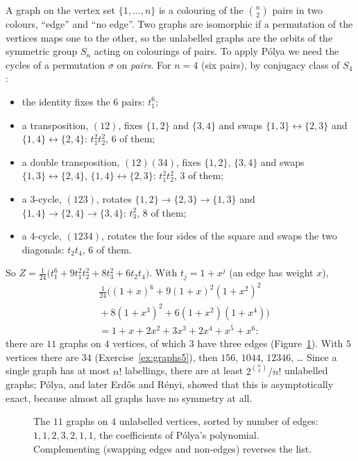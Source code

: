 A graph on the vertex set $\{1,\dots,n\}$ is a colouring of the $\binom n2$ pairs in two colours, ``edge'' and ``no edge''. Two graphs are
isomorphic if a permutation of the vertices maps one to the other, so the unlabelled graphs are the orbits of the symmetric
group $S_n$ acting on colourings of pairs. To apply P\'olya we need the cycles of a permutation $\sigma$ on \emph{pairs}. For $n=4$ (six
pairs), by conjugacy class of $S_4$:
\begin{itemize}
\item the identity fixes the $6$ pairs: $t_1^6$;
\item a transposition, $(12)$, fixes $\{1,2\}$ and $\{3,4\}$ and swaps $\{1,3\}\leftrightarrow\{2,3\}$ and $\{1,4\}\leftrightarrow\{2,4\}$: $t_1^2t_2^2$, $6$ of them;
\item a double transposition, $(12)(34)$, fixes $\{1,2\}$, $\{3,4\}$ and swaps $\{1,3\}\leftrightarrow\{2,4\}$, $\{1,4\}\leftrightarrow\{2,3\}$: $t_1^2t_2^2$, $3$ of them;
\item a $3$-cycle, $(123)$, rotates $\{1,2\}\to\{2,3\}\to\{1,3\}$ and $\{1,4\}\to\{2,4\}\to\{3,4\}$: $t_3^2$, $8$ of them;
\item a $4$-cycle, $(1234)$, rotates the four sides of the square and swaps the two diagonals: $t_2t_4$, $6$ of them.
\end{itemize}
So $Z=\frac1{24}\big(t_1^6+9t_1^2t_2^2+8t_3^2+6t_2t_4\big)$. With $t_j=1+x^j$ (an edge has weight $x$),
\[
\begin{aligned}{}&\tfrac1{24}\big((1+x)^6+9(1+x)^2(1+x^2)^2\\&{}+8(1+x^3)^2+6(1+x^2)(1+x^4)\big)\\&=1+x+2x^2+3x^3+2x^4+x^5+x^6:\end{aligned}
\]
there are $11$ graphs on $4$ vertices, of which $3$ have three edges (Figure~\ref{fig:graphs4}). With $5$ vertices there are $34$
(Exercise~\ref{ex:graphs5}), then $156$, $1044$, $12346$, \dots{} Since a single graph has at most $n!$ labellings, there are at least
$2^{\binom n2}/n!$ unlabelled graphs; P\'olya, and later Erd\H os and R\'enyi, showed that this is asymptotically exact, because almost all
graphs have no symmetry at all.

\begin{figure}[ht]
\centering
{}
\caption{The $11$ graphs on $4$ unlabelled vertices, sorted by number of edges: $1,1,2,3,2,1,1$, the coefficients of P\'olya's
polynomial. Complementing (swapping edges and non-edges) reverses the list.}
\label{fig:graphs4}
\end{figure}

